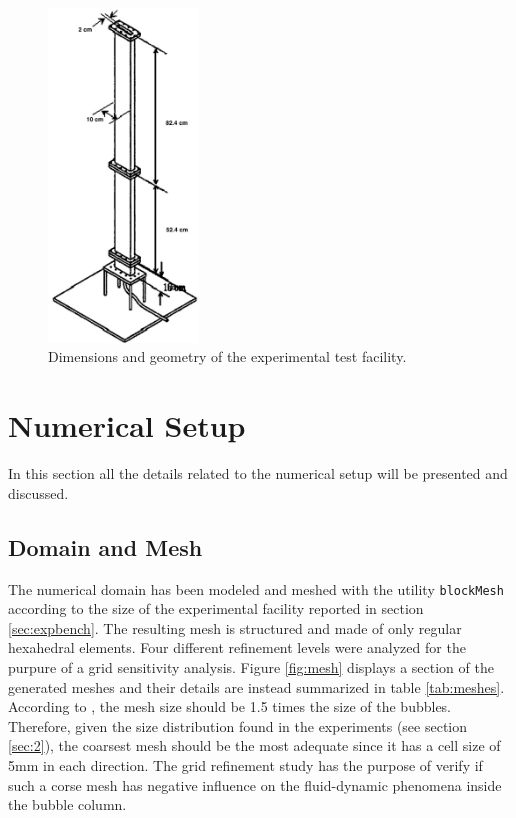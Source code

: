 \documentclass[11pt,a4paper]{article}
\begin{document}
\begin{figure}[!ht]
	\centering
	\includegraphics[width=4cm]{Images/test_facility.png}
	\caption{Dimensions and geometry of the experimental test facility.}
	\label{fig:facility}
\end{figure}

\section{Numerical Setup}
\label{sec:numsetup}
In this section all the details related to the numerical setup will be presented and discussed.




\subsection{Domain and Mesh}
\label{sub:domain}
The numerical domain has been modeled and meshed with the utility \texttt{blockMesh} according to the size of the experimental facility reported in section \ref{sec:expbench}. The resulting mesh is structured and made of only regular hexahedral elements. Four different refinement levels were analyzed for the purpure of a grid sensitivity analysis. Figure \ref{fig:mesh} displays a section of the generated meshes and their details are instead summarized in table \ref{tab:meshes}. According to \cite{krepper}, the mesh size should be 1.5 times the size of the bubbles. Therefore, given the size distribution found in the experiments (see section \ref{sec:2}),  the coarsest mesh should be the most adequate since it has a cell size of 5mm in each direction. The grid refinement study has the purpose of verify if such a corse mesh has  negative influence on the fluid-dynamic phenomena inside the bubble column.
\end{document}
